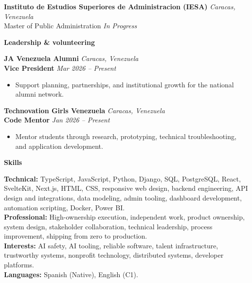 \documentclass[11pt]{article}
\begin{document}
\vspace{-4pt}
\textbf{Instituto de Estudios Superiores de Administracion (IESA)} \hfill \textit{Caracas, Venezuela} \\
Master of Public Administration \hfill \textit{In Progress}
\vspace{8pt}
\begin{center}
    \textbf{Leadership \& volunteering}
\end{center}
\vspace{-4pt}
\textbf{JA Venezuela Alumni} \hfill \textit{Caracas, Venezuela} \\
\textbf{Vice President} \hfill \textit{Mar 2026 -- Present}
\begin{itemize}
    \item Support planning, partnerships, and institutional growth for the national alumni network.
\end{itemize}
\vspace{10pt}
\textbf{Technovation Girls Venezuela} \hfill \textit{Caracas, Venezuela} \\
\textbf{Code Mentor} \hfill \textit{Jan 2026 -- Present}
\begin{itemize}
    \item Mentor students through research, prototyping, technical troubleshooting, and application development.
\end{itemize}
\vspace{8pt}
\begin{center}
    \textbf{Skills}
\end{center}
\vspace{-4pt}
\textbf{Technical:} TypeScript, JavaScript, Python, Django, SQL, PostgreSQL, React, SvelteKit, Next.js, HTML, CSS, responsive web design, backend engineering, API design and integrations, data modeling, admin tooling, dashboard development, automation scripting, Docker, Power BI.
\\[4pt]
\textbf{Professional:} High-ownership execution, independent work, product ownership, system design, stakeholder collaboration, technical leadership, process improvement, shipping from zero to production.
\\[4pt]
\textbf{Interests:} AI safety, AI tooling, reliable software, talent infrastructure, trustworthy systems, nonprofit technology, distributed systems, developer platforms.
\\[4pt]
\textbf{Languages:} Spanish (Native), English (C1).
\end{document}
